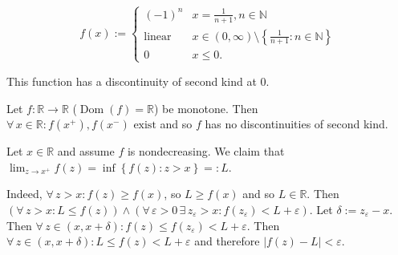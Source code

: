 \documentclass{notes}
\begin{document}
  \begin{eg}
    \begin{equation}
      f(x) := \begin{cases}
        (-1)^n & x = \frac{1}{n + 1}, n \in \mathbb N \\ 
        \text{linear} & x \in (0, \infty) \setminus \left \{ \frac{1}{n + 1} : n \in \mathbb N \right \} \\ 
        0 & x \leq 0.
      \end{cases}
    \end{equation}
    
    This function has a discontinuity of second kind at 0.
  \end{eg}
  
  \begin{lem}
    Let $f \colon \mathbb R \to \mathbb R$ ($\operatorname{Dom}(f) = \mathbb R  $) be monotone.
    Then $\forall \, x \in \mathbb R: \text{$f(x^+), f(x^-)$ exist}$ and so $f$ has no discontinuities of second kind.
  \end{lem}
  
  \begin{prf}
    Let $x \in \mathbb R$ and assume $f$ is nondecreasing.
    We claim that $\lim_{z \to x^+} f(z) = \inf \left \{ f(z) : z > x \right \}=: L$.

    Indeed, $\forall \, z > x: f(z) \geq f(x)$, so $L \geq f(x)$ and so $L \in \mathbb R$.
    Then $(\forall \, z > x: L \leq f(z)) \land (\forall \, \varepsilon > 0 \, \exists \, z_\varepsilon  > x: f(z_\varepsilon) < L + \varepsilon)$.
    Let $\delta := z_\varepsilon - x$.
    Then $\forall \, z \in (x, x + \delta): f(z) \leq f(z_\varepsilon) < L + \varepsilon$.
    Then $\forall \, z \in (x, x + \delta): L \leq f(z) < L + \varepsilon$ and therefore $\left | f(z) - L \right | < \varepsilon$.
  \end{prf}
\end{document}
